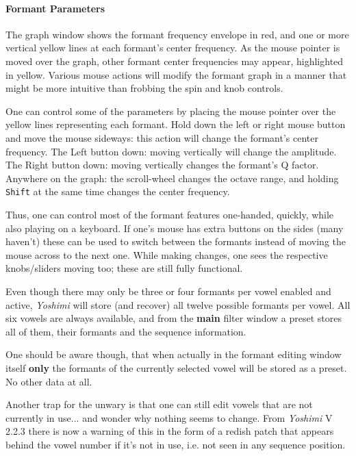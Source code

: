 \paragraph{Formant Parameters}
\label{paragraph:formant_parameters}

   The graph window shows the formant frequency envelope in red,
   and one or more vertical yellow lines at each formant's center frequency.
   As the mouse pointer is moved over the graph, other formant center
   frequencies may appear, highlighted in yellow.
   Various mouse actions will modify the formant graph in a manner that might
   be more intuitive than frobbing the spin and knob controls.

   One can control some of the parameters by placing the mouse pointer over
   the yellow lines representing each formant.
   Hold down the left or right mouse button and move the mouse sideways:
   this action will change the formant's center frequency.
   The Left button down: moving vertically will change the amplitude.
   The Right button down: moving vertically changes the formant's Q factor.
   Anywhere on the graph: the scroll-wheel changes the octave range, and
   holding \texttt{Shift} at the same time changes the center frequency.

   Thus, one can control most of the formant features one-handed, quickly,
   while also playing on a keyboard.
   If one's mouse has extra buttons on the sides (many haven't) these can
   be used to switch between the formants instead of moving the mouse across
   to the next one.
   While making changes, one sees the respective knobs/sliders moving
   too; these are still fully functional.

   Even though there may only be three or four formants per vowel enabled
   and active, \textsl{Yoshimi} will store (and recover) all twelve possible
   formants per vowel.
   All six vowels are always available, and from the \textbf{main} filter
   window a preset stores all of them, their formants and the sequence
   information.

   One should be aware though, that when actually in the formant editing
   window itself \textbf{only} the formants of the currently selected vowel
   will be stored as a preset. No other data at all.

   Another trap for the unwary is that one can still edit vowels that are
   not currently in use... and wonder why nothing seems to change. From
   \textsl{Yoshimi} V 2.2.3 there is now a warning of this in the form of
   a redish patch that appears behind the vowel number if it's not in use,
   i.e. not seen in any sequence position.

